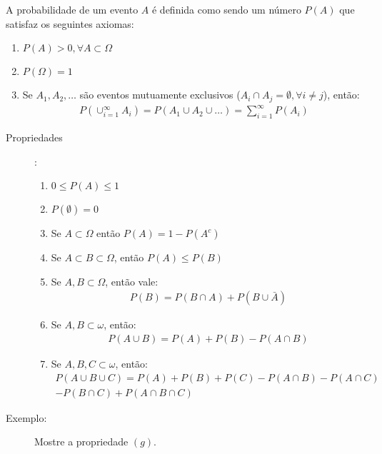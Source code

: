 A probabilidade de um evento $A$ é definida como sendo um número $P(A)$ que satisfaz
os seguintes axiomas:
\begin{enumerate}[leftmargin=*, label=\Roman*., widest=IV, align=left]
  \item $P(A) > 0, \forall A \subset \Omega$ 
  \item $P(\Omega)=1$
  \item Se $A_1, A_2,\ldots$ são eventos mutuamente exclusivos ($A_i \cap A_j = \emptyset, \forall i \neq j$), então:
    \begin{align}
      P(\cup^\infty_{i=1} A_i)= P(A_1\cup A_2 \cup \ldots)= \sum \limits^\infty_{i=1} P(A_i) 
    \end{align}
\end{enumerate}
\begin{description}
  \item[Propriedades]:

    \begin{enumerate}[label=(\alph*)]
      \item $0 \le P(A) \le 1$
      \item $P(\emptyset)=0$
      \item Se $A \subset \Omega$ então $P(A)=1-P(A^c)$
      \item Se $A \subset B \subset \Omega$, então $P(A) \le P(B)$
      \item Se $A,B \subset \Omega$, então vale:
        \begin{align}
          P(B)= P(B\cap A)+ P(B\cup \bar{A})
        \end{align}
      \item Se $A,B \subset \omega$, então:
        \begin{align}
          P(A\cup B)= P(A)+P(B)-P(A\cap B)
        \end{align}
      \item Se $A,B,C \subset \omega$, então:
        \begin{align}
          P(A\cup B \cup C)= P(A)+P(B)+P(C)-P(A \cap B)- P(A \cap C) \nonumber\\-
          P(B\cap C)+P(A\cap B \cap C) 
        \end{align}
    \end{enumerate}
  \item [Exemplo:] Mostre a propriedade $(g)$.


\end{description}
